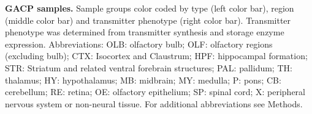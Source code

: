 \textbf{GACP samples.} Sample groups color coded by type (left color bar), region (middle color bar) and transmitter phenotype (right color bar). Transmitter phenotype was determined from transmitter synthesis and storage enzyme expression. Abbreviations: OLB: olfactory bulb; OLF: olfactory regions (excluding bulb); CTX: Isocortex and Claustrum; HPF: hippocampal formation; STR: Striatum and related ventral forebrain structures; PAL: pallidum; TH: thalamus; HY: hypothalamus; MB: midbrain; MY: medulla; P: pons; CB: cerebellum; RE: retina; OE: olfactory epithelium; SP: spinal cord; X: peripheral nervous system or non-neural tissue. For additional abbreviations see Methods.